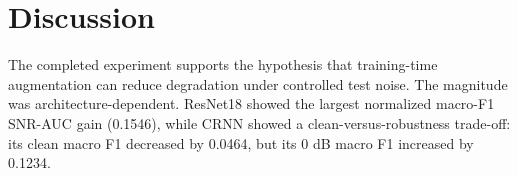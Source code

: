 \section{Discussion}

The completed experiment supports the hypothesis that training-time
augmentation can reduce degradation under controlled test noise. The magnitude
was architecture-dependent. ResNet18 showed the largest normalized macro-F1
SNR-AUC gain (0.1546), while CRNN showed a clean-versus-robustness trade-off:
its clean macro F1 decreased by 0.0464, but its 0 dB macro F1 increased by
0.1234.


